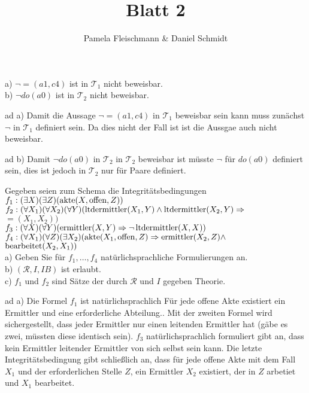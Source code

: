 \documentclass[12pt,a4paper]{amsart}
\begin{document}
\title{Blatt 2}

\author{Pamela Fleischmann \& Daniel Schmidt}

\maketitle

\begin{aufgabe1}
a) $\lnot =(a1,c4)$ ist in $\mathcal{T}_1$ nicht beweisbar.\\
b) $\lnot do(a0)$ ist in $\mathcal{T}_2$ nicht beweisbar.
\end{aufgabe1}

\medskip

ad a) Damit die Aussage  $\lnot =(a1,c4)$ in  $\mathcal{T}_1$  beweisbar sein kann muss zunächst $\lnot$ in $\mathcal{T}_1$ definiert sein. Da dies nicht der Fall ist ist die Aussgae auch nicht beweisbar.
\medskip

ad b) Damit $\lnot do(a0)$ in $\mathcal{T}_2$ in $\mathcal{T}_2$ beweisbar ist müsste $\lnot$ für $do(a0)$ definiert sein, dies ist jedoch in $\mathcal{T}_2$ nur für Paare definiert.

\bigskip

\begin{aufgabe1}
Gegeben seien zum Schema die Integritätsbedingungen\\
$f_1:(\exists X)(\exists Z)(\operatorname{akte}(X,\operatorname{offen},Z))$\\
$f_2:(\forall X_1)(\forall X_2)(\forall Y)(\operatorname{ltdermittler}(X_1,Y)\land\operatorname{ltdermittler}(X_2,Y)\Rightarrow$\\ $=(X_1,X_2))$\\
$f_3:(\forall X)(\forall Y)(\operatorname{ermittler}(X,Y)\Rightarrow\lnot\operatorname{ltdermittler}(X,X))$\\
$f_4:(\forall X_1)(\forall Z)(\exists X_2)(\operatorname{akte}(X_1,\operatorname{offen},Z)\Rightarrow\operatorname{ermittler}(X_2,Z)\land$\\ $\operatorname{bearbeitet}(X_2,X_1))$\\
a) Geben Sie für $f_1,\dots,f_4$ natürlichsprachliche Formulierungen an.\\
b) $(\mathcal{R},I,IB)$ ist erlaubt.\\
c) $f_1$ und $f_2$ sind Sätze der durch $\mathcal{R}$ und $I$ gegeben Theorie.
\end{aufgabe1}

\medskip

ad a) Die Formel $f_1$ ist natürlichsprachlich \glqq Für jede offene Akte existiert ein Ermittler und eine erforderliche Abteilung.\grqq . Mit
der zweiten Formel wird sichergestellt, dass jeder Ermittler nur einen leitenden Ermittler hat (gäbe es zwei, müssten diese identisch sein). $f_3$
natürlichsprachlich formuliert gibt an, dass kein Ermittler leitender Ermittler von sich selbst sein kann. Die letzte Integritätsbedingung gibt
schließlich an, dass für jede offene Akte mit dem Fall $X_1$ und der erforderlichen Stelle $Z$, ein Ermittler $X_2$ existiert, der in $Z$ arbetiet und
$X_1$ bearbeitet.
\end{document}
